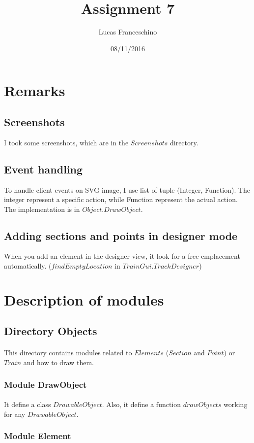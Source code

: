 \documentclass{article}
\title{Assignment 7}
\date{08/11/2016}
\author{Lucas Franceschino}
\begin{document}
	\maketitle

	\section{Remarks}
		\subsection{Screenshots}
			I took some screenshots, which are in the $Screenshots$ directory.
		\subsection{Event handling}
			To handle client events on SVG image, I use list of tuple (Integer, Function). The integer represent a specific action, while Function represent the actual action. The implementation is in $Object.DrawObject$.
		\subsection{Adding sections and points in designer mode}
			When you add an element in the designer view, it look for a free emplacement automatically. ($findEmptyLocation$ in $TrainGui.TrackDesigner$)
	\section{Description of modules}
		\subsection{Directory Objects}
			\paragraph{} This directory contains modules related to $Elements$ ($Section$ and $Point$) or $Train$ and how to draw them.
			\subsubsection{Module DrawObject}
				\paragraph{} It define a class $DrawableObject$. Also, it define a function $drawObjects$ working for any $DrawableObject$.
			\subsubsection{Module Element}
\end{document}
